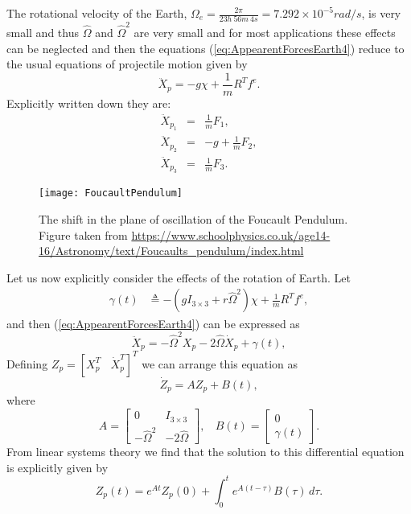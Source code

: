 \documentclass[graybox,envcountchap,sectrefs]{svmonoMuga}
\begin{document}
The rotational velocity of the Earth,
$\Omega_e =
\frac{2\pi}{23h \:56m \:4 s}
= 7.292 \times 10^{-5} rad/s$, is very small and thus $\widehat{\Omega}$ and $\widehat{\Omega}^2$ are very small and for most applications these effects can be neglected and then the equations (\ref{eq:AppearentForcesEarth4})
reduce to the usual equations of projectile motion given by
\begin{equation}\label{eq:ApproximateEarth}
\ddot{X}_p=-g\chi+\frac{1}{m}R^Tf^e.
\end{equation}
Explicitly written down they are:
\begin{eqnarray}
\ddot{X}_{p_1} &=& \frac{1}{m}F_1,\label{eq:Earth4}\\
\ddot{X}_{p_2} &=& -g+\frac{1}{m}F_2,\label{eq:Earth5}\\
\ddot{X}_{p_3} &=& \frac{1}{m}F_3.\label{eq:Earth6}
\end{eqnarray}

\begin{figure}[ht]
\begin{center}
\texttt{[image: FoucaultPendulum]} 
\caption{The shift in the plane of oscillation of the Foucault Pendulum. Figure taken from \url{https://www.schoolphysics.co.uk/age14-16/Astronomy/text/Foucaults_pendulum/index.html}} \label{Fig:Foucault}
\end{center}
\end{figure}


Let us now explicitly consider the effects of the rotation of Earth. Let 
\begin{align*}
\gamma(t)&\triangleq-\left(gI_{3\times 3}+r\widehat{\Omega}^2 \right)\chi+\frac{1}{m}R^Tf^e,
\end{align*} 
and then (\ref{eq:AppearentForcesEarth4}) can be expressed as
\begin{equation}
\ddot{X}_p=-\widehat{\Omega}^2{X}_p-2\widehat{\Omega}\dot{X}_p+\gamma(t),\label{eq:AppearentForcesEarth5}
\end{equation}
Defining $Z_p=[X_p^T\:\:\:\:\dot{X}_p^T]^T$ we can arrange this equation as
\[
\dot{Z}_p=AZ_p+B(t),
\]
where
\[
A=\begin{bmatrix}0 & I_{3\times 3}\\-\widehat{\Omega}^2 & -2\widehat{\Omega}\end{bmatrix},
\:\:\:\:
B(t)=\begin{bmatrix}0 \\ \gamma(t)\end{bmatrix}.
\]
From linear systems theory we find that the solution to this differential equation is explicitly given by
\begin{equation}
{Z}_p(t)=e^{At}{Z}_p(0)+\int_0^te^{A(t-\tau)}B(\tau)\,d\tau.\label{eq:AppearentForcesEarth55}
\end{equation}
\end{document}

